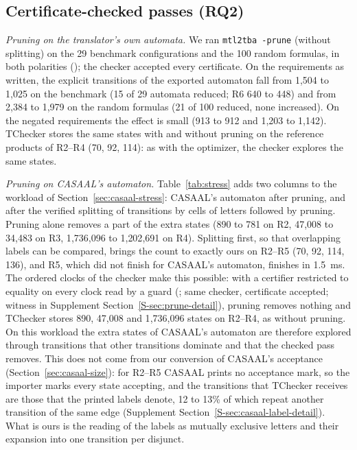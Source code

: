 \subsection{Certificate-checked passes (RQ2)}
\label{sec:eval-checked}
\emph{Pruning on the translator's own automata.} We ran \texttt{mtl2tba -prune} (without splitting) on the 29 benchmark configurations and the 100 random formulas, in both polarities (); the checker accepted every certificate. On the requirements as written, the explicit transitions of the exported automaton fall from 1{,}504 to 1{,}025 on the benchmark (15 of 29 automata reduced; R6 640 to 448) and from 2{,}384 to 1{,}979 on the random formulas (21 of 100 reduced, none increased). On the negated requirements the effect is small (913 to 912 and 1{,}203 to 1{,}142). TChecker stores the same states with and without pruning on the reference products of R2--R4 (70, 92, 114): as with the optimizer, the checker explores the same states.

\emph{Pruning on CASAAL's automaton.} Table~\ref{tab:stress} adds two columns to the workload of Section~\ref{sec:casaal-stress}: CASAAL's automaton after pruning, and after the verified splitting of transitions by cells of letters followed by pruning. Pruning alone removes a part of the extra states (890 to 781 on R2, 47{,}008 to 34{,}483 on R3, 1{,}736{,}096 to 1{,}202{,}691 on R4). Splitting first, so that overlapping labels can be compared, brings the count to exactly ours on R2--R5 (70, 92, 114, 136), and R5, which did not finish for CASAAL's automaton, finishes in 1.5~ms. The ordered clocks of the checker make this possible: with a certifier restricted to equality on every clock read by a guard (; same checker, certificate accepted; witness in Supplement Section~\ref{S-sec:prune-detail}), pruning removes nothing and TChecker stores 890, 47{,}008 and 1{,}736{,}096 states on R2--R4, as without pruning. On this workload the extra states of CASAAL's automaton are therefore explored through transitions that other transitions dominate and that the checked pass removes. This does not come from our conversion of CASAAL's acceptance (Section~\ref{sec:casaal-size}): for R2--R5 CASAAL prints no acceptance mark, so the importer marks every state accepting, and the transitions that TChecker receives are those that the printed labels denote, 12 to 13\% of which repeat another transition of the same edge (Supplement Section~\ref{S-sec:casaal-label-detail}). What is ours is the reading of the labels as mutually exclusive letters and their expansion into one transition per disjunct.

